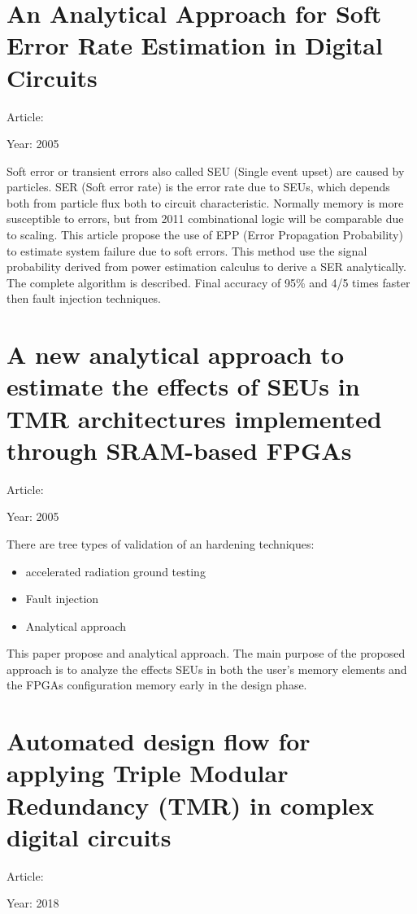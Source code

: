 {	\section{An Analytical Approach for Soft Error Rate Estimation in Digital Circuits}{
		Article: \cite{SER_estimation_analytical}
		
		Year: 2005
		
		Soft error or transient errors also called SEU (Single event upset) are caused by particles. SER (Soft error rate) is the error rate due to SEUs, which depends both from particle flux both to circuit characteristic. Normally memory is more susceptible to errors, but from 2011 combinational logic will be comparable due to scaling. 
		This article propose the use of EPP (Error Propagation Probability) to estimate system failure due to soft errors. This method use the signal probability derived from power estimation calculus to derive a SER analytically. The complete algorithm is described. Final accuracy of 95\% and 4/5 times faster then fault injection techniques. 
	}
	\section{A new analytical approach to estimate the effects of SEUs in TMR architectures implemented through SRAM-based FPGAs}{
		Article: \cite{SEU_effect_in_TMR_analytical}	
		
		Year: 2005
		
		There are tree types of validation of an hardening techniques: 
		\begin{itemize}
			\item  accelerated radiation ground testing
			\item  Fault injection
		    \item  Analytical approach 
		\end{itemize}
		This paper propose and analytical approach. The main purpose of the proposed approach is to analyze the effects SEUs in both the user’s memory elements and the FPGAs configuration memory early in the design phase. 
	}
	\section{Automated design flow for applying Triple Modular Redundancy (TMR) in complex digital circuits}{
		Article: \cite{Automated_TMR_complex_digital_circuits}
		
		Year: 2018
		
}}
